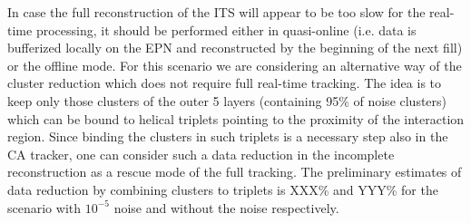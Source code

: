 In case the full reconstruction of the ITS will appear to be too slow for the real-time processing, it should be
performed either in quasi-online (i.e. data is bufferized locally on the EPN and reconstructed by the
beginning of the next fill) or the offline mode. For this scenario we are considering an alternative way of 
the cluster reduction which does not require full real-time tracking. The idea is to keep only those clusters
of the outer 5 layers (containing 95\% of noise clusters)
which can be bound to helical triplets pointing to the proximity of the interaction region. Since binding the
clusters in such triplets is a necessary step also in the CA tracker, one can consider such a data reduction
in the incomplete reconstruction as a rescue mode of the full tracking. The preliminary estimates of data
reduction by combining clusters to triplets is XXX\% and YYY\% for the scenario with $10^{-5}$ noise and 
without the noise respectively.
